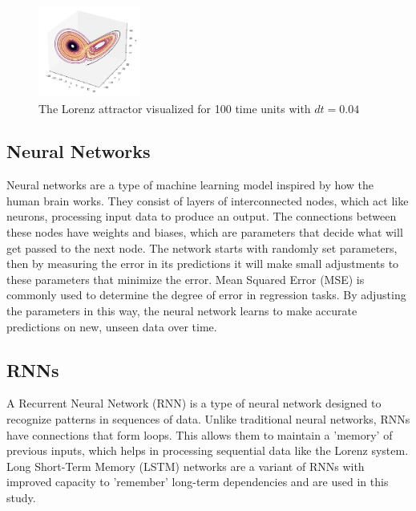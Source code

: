 \documentclass[11pt]{article}
\begin{document}
\begin{figure}[h]

\centering
\includegraphics[width=0.3\textwidth]{lorenz_attractor.jpeg}
\caption{The Lorenz attractor visualized for 100 time units with $dt=0.04$}
\label{fig:lorenz_attractor}
\end{figure}

\subsection{Neural Networks}

Neural networks are a type of machine learning model inspired by how the human brain works. They consist of layers of interconnected nodes, which act like neurons, processing input data to produce an output. The connections between these nodes have weights and biases, which are parameters that decide what will get passed to the next node. The network starts with randomly set parameters, then by measuring the error in its predictions it will make small adjustments to these parameters that minimize the error. Mean Squared Error (MSE) is commonly used to determine the degree of error in regression tasks. By adjusting the parameters in this way, the neural network learns to make accurate predictions on new, unseen data over time.


\subsection{RNNs}

A Recurrent Neural Network (RNN) is a type of neural network designed to recognize patterns in sequences of data. Unlike traditional neural networks, RNNs have connections that form loops. This allows them to maintain a 'memory' of previous inputs, which helps in processing sequential data like the Lorenz system. Long Short-Term Memory (LSTM) networks are a variant of RNNs with improved capacity to 'remember' long-term dependencies and are used in this study.  
\end{document}
